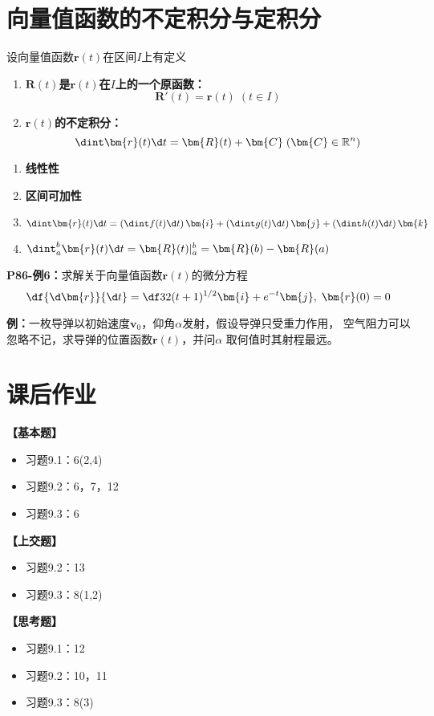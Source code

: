 \section{向量值函数的不定积分与定积分}

设向量值函数$\bm{r}(t)$在区间$I$上有定义 
\begin{enumerate}
  \item {\bf $\bm{R}(t)$是$\bm{r}(t)$在$I$上的一个原函数：} 
  $$\bm{R}'(t)=\bm{r}(t)\;(t\in I)$$ 
  \item {\bf $\bm{r}(t)$的不定积分：}
  $$\dint \bm{r}(t)\d t=\bm{R}(t)+\bm{C}\;(\bm{C}\in\mathbb{R}^n)$$
\end{enumerate}

\begin{enumerate}
  \item {\bf 线性性} 
  \item {\bf 区间可加性} 
  \item $\dint\bm{r}(t)\d t=\left(\dint f(t)\d t\right)\bm{i}
  +\left(\dint g(t)\d t\right)\bm{j}+\left(\dint h(t)\d t\right)\bm{k}$ 
  \item $\dint_a^b\bm{r}(t)\d t=\bm{R}(t)|_a^b=\bm{R}(b)-\bm{R}(a)$
\end{enumerate}

{\bf P86-例6：}求解关于向量值函数$\bm{r}(t)$的微分方程
$$\df{\d\bm{r}}{\d t}=\df 32(t+1)^{1/2}\bm{i}+e^{-t}\bm{j},\;\bm{r}(0)=0$$

{\bf 例：}一枚导弹以初始速度$\bm{v}_0$，仰角$\alpha$发射，假设导弹只受重力作用，
空气阻力可以忽略不记，求导弹的位置函数$\bm{r}(t)$，并问$\alpha$
取何值时其射程最远。

\newpage

\section*{课后作业}

{\bf 【基本题】}

\begin{itemize}
  \setlength{\itemindent}{1cm}
  \item 习题9.1：6(2,4)
  \item 习题9.2：6，7，12
  \item 习题9.3：6
\end{itemize}

{\bf 【上交题】}

\begin{itemize}
  \setlength{\itemindent}{1cm}
  \item 习题9.2：13
  \item 习题9.3：8(1,2)
\end{itemize}


{\bf 【思考题】}

\begin{itemize}
  \setlength{\itemindent}{1cm}
  \item 习题9.1：12
  \item 习题9.2：10，11
  \item 习题9.3：8(3)
\end{itemize}